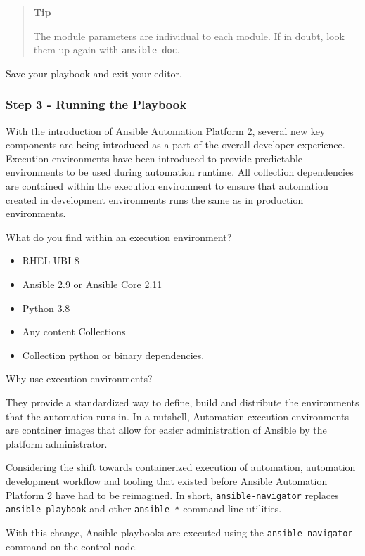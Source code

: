 \begin{quote}
\textbf{Tip}

The module parameters are individual to each module. If in doubt, look
them up again with \texttt{ansible-doc}.
\end{quote}

Save your playbook and exit your editor.

\hypertarget{step-3---running-the-playbook}{%
\subsubsection{Step 3 - Running the
Playbook}\label{step-3---running-the-playbook}}

With the introduction of Ansible Automation Platform 2, several new key
components are being introduced as a part of the overall developer
experience. Execution environments have been introduced to provide
predictable environments to be used during automation runtime. All
collection dependencies are contained within the execution environment
to ensure that automation created in development environments runs the
same as in production environments.

What do you find within an execution environment?

\begin{itemize}
\tightlist
\item
  RHEL UBI 8
\item
  Ansible 2.9 or Ansible Core 2.11
\item
  Python 3.8
\item
  Any content Collections
\item
  Collection python or binary dependencies.
\end{itemize}

Why use execution environments?

They provide a standardized way to define, build and distribute the
environments that the automation runs in. In a nutshell, Automation
execution environments are container images that allow for easier
administration of Ansible by the platform administrator.

Considering the shift towards containerized execution of automation,
automation development workflow and tooling that existed before Ansible
Automation Platform 2 have had to be reimagined. In short,
\texttt{ansible-navigator} replaces \texttt{ansible-playbook} and other
\texttt{ansible-*} command line utilities.

With this change, Ansible playbooks are executed using the
\texttt{ansible-navigator} command on the control node.

